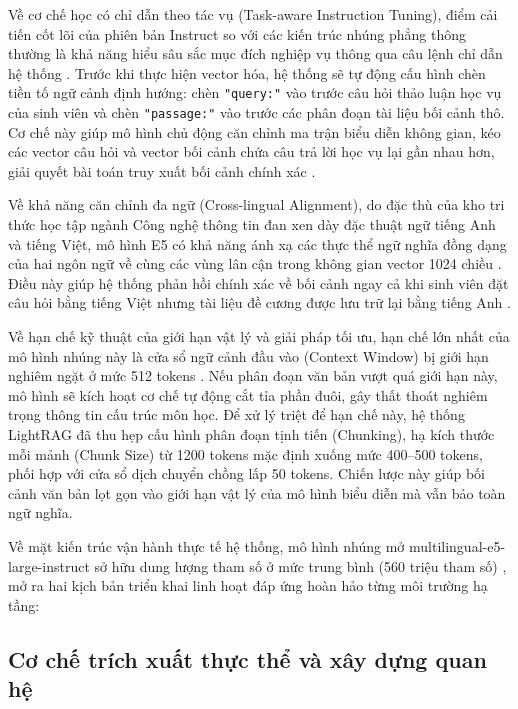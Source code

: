 \indent Về cơ chế học có chỉ dẫn theo tác vụ (Task-aware Instruction Tuning), điểm cải tiến cốt lõi của phiên bản Instruct so với các kiến trúc nhúng phẳng thông thường là khả năng hiểu sâu sắc mục đích nghiệp vụ thông qua câu lệnh chỉ dẫn hệ thống \cite{optimal_rag_textbook}. Trước khi thực hiện vector hóa, hệ thống sẽ tự động cấu hình chèn tiền tố ngữ cảnh định hướng: chèn \texttt{"query:"} vào trước câu hỏi thảo luận học vụ của sinh viên và chèn \texttt{"passage:"} vào trước các phân đoạn tài liệu bối cảnh thô. Cơ chế này giúp mô hình chủ động căn chỉnh ma trận biểu diễn không gian, kéo các vector câu hỏi và vector bối cảnh chứa câu trả lời học vụ lại gần nhau hơn, giải quyết bài toán truy xuất bối cảnh chính xác \cite{multilingual_e5}.

\indent Về khả năng căn chỉnh đa ngữ (Cross-lingual Alignment), do đặc thù của kho tri thức học tập ngành Công nghệ thông tin đan xen dày đặc thuật ngữ tiếng Anh và tiếng Việt, mô hình E5 có khả năng ánh xạ các thực thể ngữ nghĩa đồng dạng của hai ngôn ngữ về cùng các vùng lân cận trong không gian vector 1024 chiều \cite{multilingual_e5}. Điều này giúp hệ thống phản hồi chính xác về bối cảnh ngay cả khi sinh viên đặt câu hỏi bằng tiếng Việt nhưng tài liệu đề cương được lưu trữ lại bằng tiếng Anh \cite{multilingual_e5}.

\indent Về hạn chế kỹ thuật của giới hạn vật lý và giải pháp tối ưu, hạn chế lớn nhất của mô hình nhúng này là cửa sổ ngữ cảnh đầu vào (Context Window) bị giới hạn nghiêm ngặt ở mức 512 tokens \cite{multilingual_e5}. Nếu phân đoạn văn bản vượt quá giới hạn này, mô hình sẽ kích hoạt cơ chế tự động cắt tỉa phần đuôi, gây thất thoát nghiêm trọng thông tin cấu trúc môn học. Để xử lý triệt để hạn chế này, hệ thống LightRAG đã thu hẹp cấu hình phân đoạn tịnh tiến (Chunking), hạ kích thước mỗi mảnh (Chunk Size) từ 1200 tokens mặc định xuống mức 400–500 tokens, phối hợp với cửa sổ dịch chuyển chồng lấp 50 tokens. Chiến lược này giúp bối cảnh văn bản lọt gọn vào giới hạn vật lý của mô hình biểu diễn mà vẫn bảo toàn ngữ nghĩa.

\indent Về mặt kiến trúc vận hành thực tế hệ thống, mô hình nhúng mở multilingual-e5-large-instruct sở hữu dung lượng tham số ở mức trung bình (560 triệu tham số) \cite{multilingual_e5}, mở ra hai kịch bản triển khai linh hoạt đáp ứng hoàn hảo từng môi trường hạ tầng:
\clearpage
\subsection{Cơ chế trích xuất thực thể và xây dựng quan hệ}

